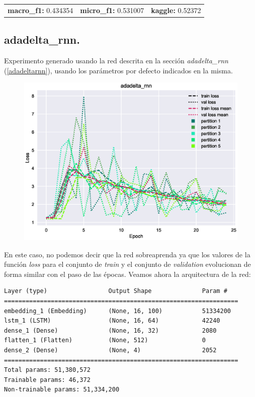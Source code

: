 \documentclass[11pt]{article}
\begin{document}
\begin{table}[H]
\begin{tabular}{c|c|c}
\textbf{macro\_f1:} 0.434354 & \textbf{micro\_f1:} 0.531007 & \textbf{kaggle:} 0.52372
\end{tabular}
\end{table}

\subsection{adadelta\_rnn.} \label{exp_adadeltarnn}

Experimento generado usando la red descrita en la sección \textit{adadelta\_rnn} (\ref{adadeltarnn}), usando los parámetros por defecto indicados en la misma.

\begin{figure}[H]
\includegraphics[width=\linewidth]{images/loss/adadelta_rnn-1554205042.eps}
\end{figure}

En este caso, no podemos decir que la red sobreaprenda ya que los valores de la función \textit{loss} para el conjunto de \textit{train} y el conjunto de \textit{validation} evolucionan de forma similar con el paso de las épocas. Veamos ahora la arquitectura de la red:

\begin{verbatim}
Layer (type)                 Output Shape              Param #   
=================================================================
embedding_1 (Embedding)      (None, 16, 100)           51334200  
lstm_1 (LSTM)                (None, 16, 64)            42240     
dense_1 (Dense)              (None, 16, 32)            2080      
flatten_1 (Flatten)          (None, 512)               0         
dense_2 (Dense)              (None, 4)                 2052      
=================================================================
Total params: 51,380,572
Trainable params: 46,372
Non-trainable params: 51,334,200
\end{verbatim}
\end{document}
